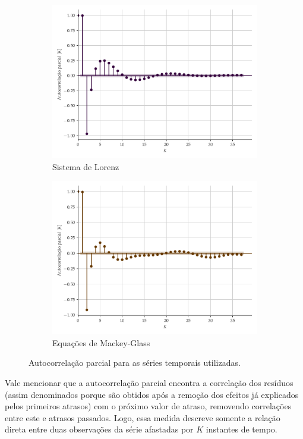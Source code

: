 \documentclass[a4paper, 12pt]{article}
\begin{document}
\begin{figure}[H]
\begin{subfigure}[t]{0.325\textwidth}
         \includegraphics[scale=0.30]{autocorrelacao-parcial-lorenz.pdf}
         \caption{Sistema de Lorenz}
     \end{subfigure}
     \centering
     \begin{subfigure}[t]{0.325\textwidth} 
         \includegraphics[scale=0.30]{autocorrelacao-parcial-mackeyglass.pdf}
         \caption{Equações de Mackey-Glass}
     \end{subfigure}  
     \centering   
     \caption{Autocorrelação parcial para as séries temporais utilizadas.}
     \label{fig:autocorrelation}
\end{figure}

Vale mencionar que a autocorrelação parcial encontra a correlação dos resíduos (assim denominados porque são obtidos após a remoção dos efeitos já explicados pelos primeiros atrasos) com o próximo valor de atraso, removendo correlações entre este e atrasos passados. Logo, essa medida descreve somente a relação direta entre duas observações da série afastadas por $K$ instantes de tempo.
\end{document}
